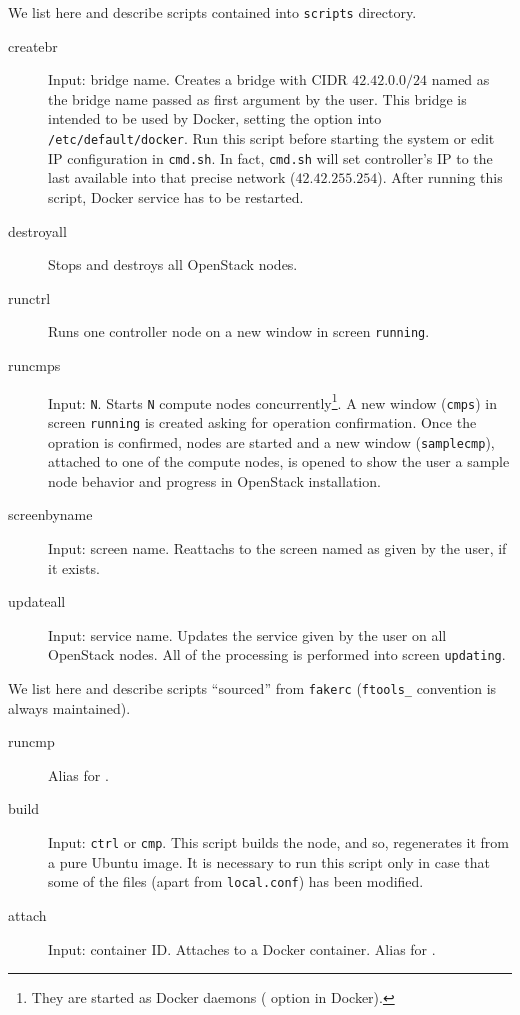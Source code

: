 We list here and describe scripts contained into \texttt{scripts} directory.
\begin{description}
	\item[createbr] Input: bridge name. Creates a bridge with CIDR $42.42.0.0/24$ named as the bridge name passed as first argument by the user. This bridge is intended to be used by Docker, setting the option  into \texttt{/etc/default/docker}. Run this script before starting the system or edit IP configuration in \texttt{cmd.sh}. In fact, \texttt{cmd.sh} will set controller's IP to the last available into that precise network ($42.42.255.254$). After running this script, Docker service has to be restarted.
	\item[destroyall] Stops and destroys all OpenStack nodes.
	\item[runctrl] Runs one controller node on a new window in screen \texttt{running}.
	\item[runcmps] Input: \texttt{N}. Starts \texttt{N} compute nodes concurrently\footnote{They are started as Docker daemons ( option in Docker).}. A new window (\texttt{cmps}) in screen \texttt{running} is created asking for operation confirmation. Once the opration is confirmed, nodes are started and a new window (\texttt{samplecmp}), attached to one of the compute nodes, is opened to show the user a sample node behavior and progress in OpenStack installation.
	\item[screenbyname] Input: screen name. Reattachs to the screen named as given by the user, if it exists.
	\item[updateall] Input: service name. Updates the service given by the user on all OpenStack nodes. All of the processing is performed into screen \texttt{updating}.
\end{description}

We list here and describe scripts ``sourced'' from \texttt{fakerc} (\texttt{ftools\_} convention is always maintained).
\begin{description}
	\item[runcmp] Alias for .
	\item[build] Input: \texttt{ctrl} or \texttt{cmp}. This script builds the node, and so, regenerates it from a pure Ubuntu image. It is necessary to run this script only in case that some of the files (apart from \texttt{local.conf}) has been modified.
	\item[attach] Input: container ID. Attaches to a Docker container. Alias for .
\end{description}

